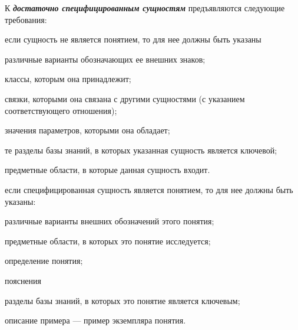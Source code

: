 К \textbf{\textit{достаточно специфицированным сущностям}} предъявляются следующие требования:
\begin{textitemize}
\item если сущность не является понятием, то для нее должны быть указаны
\begin{textitemize}
	\item различные варианты обозначающих ее внешних знаков;
	\item классы, которым она принадлежит;
	\item связки, которыми она связана с другими сущностями (с указанием соответствующего отношения);
	\item значения параметров, которыми она обладает;
	\item те разделы базы знаний, в которых указанная сущность является ключевой;
	\item предметные области, в которые данная сущность входит.
\end{textitemize}
\item если специфицированная сущность является понятием, то для нее должны быть указаны:
\begin{textitemize}
	\item различные варианты внешних обозначений этого понятия;
	\item предметные области, в которых это понятие исследуется;
	\item определение понятия;
	\item пояснения
	\item разделы базы знаний, в которых это понятие является ключевым;
	\item описание примера --- пример экземпляра понятия.
\end{textitemize}
\end{textitemize}

\begin{SCn}

\begin{scnsubdividing}
\end{scnsubdividing}
\end{SCn}

